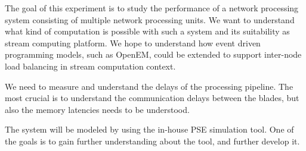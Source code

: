 The goal of this experiment is to study the performance of a network processing system consisting of multiple network processing units. We want to understand what kind of computation is possible with such a system and its suitability as stream computing platform. We hope to understand how event driven programming models, such as OpenEM, could be extended to support inter-node load balancing in stream computation context.

We need to measure and understand the delays of the processing pipeline. The most crucial is to understand the communication delays between the blades, but also the memory latencies needs to be understood.

The system will be modeled by using the in-house PSE simulation tool. One of the goals is to gain further understanding about the tool, and further develop it.

